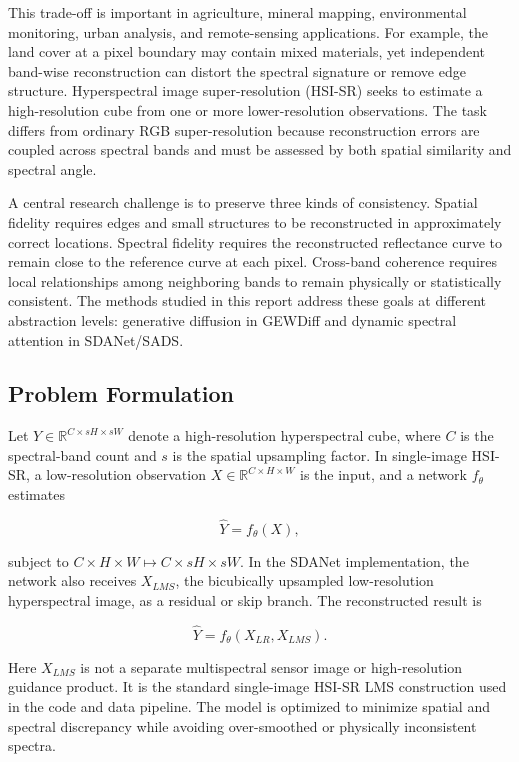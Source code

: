 \documentclass[10pt,twocolumn,letterpaper]{article}
\begin{document}
This trade-off is important in agriculture, mineral mapping, environmental monitoring, urban analysis, and remote-sensing applications. For example, the land cover at a pixel boundary may contain mixed materials, yet independent band-wise reconstruction can distort the spectral signature or remove edge structure. Hyperspectral image super-resolution (HSI-SR) seeks to estimate a high-resolution cube from one or more lower-resolution observations. The task differs from ordinary RGB super-resolution because reconstruction errors are coupled across spectral bands and must be assessed by both spatial similarity and spectral angle.

A central research challenge is to preserve three kinds of consistency. Spatial fidelity requires edges and small structures to be reconstructed in approximately correct locations. Spectral fidelity requires the reconstructed reflectance curve to remain close to the reference curve at each pixel. Cross-band coherence requires local relationships among neighboring bands to remain physically or statistically consistent. The methods studied in this report address these goals at different abstraction levels: generative diffusion in GEWDiff and dynamic spectral attention in SDANet/SADS.

\subsection{Problem Formulation}

Let $Y\in\mathbb{R}^{C\times sH\times sW}$ denote a high-resolution hyperspectral cube, where $C$ is the spectral-band count and $s$ is the spatial upsampling factor. In single-image HSI-SR, a low-resolution observation $X\in\mathbb{R}^{C\times H\times W}$ is the input, and a network $f_\theta$ estimates

\begin{equation}
    \hat{Y}=f_\theta(X),
\end{equation}

subject to $C\times H\times W\mapsto C\times sH\times sW$. In the SDANet implementation, the network also receives $X_{LMS}$, the bicubically upsampled low-resolution hyperspectral image, as a residual or skip branch. The reconstructed result is

\begin{equation}
    \hat{Y}=f_\theta(X_{LR},X_{LMS}).
\end{equation}

Here $X_{LMS}$ is not a separate multispectral sensor image or high-resolution guidance product. It is the standard single-image HSI-SR LMS construction used in the code and data pipeline. The model is optimized to minimize spatial and spectral discrepancy while avoiding over-smoothed or physically inconsistent spectra.
\end{document}
